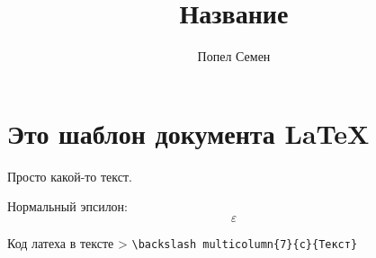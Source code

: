 \documentclass[a4paper,12pt]{article}%
\title{Название}
\author{Попел Семен}
\renewcommand{\epsilon}{\ensuremath{\varepsilon}}
\begin{document}
	
\thispagestyle{fancy}

\maketitle

\begin{abstract}

\end{abstract}

\section{Это шаблон документа \LaTeX}

Просто какой-то текст.

Нормальный эпсилон:
\[ \epsilon \]

Код латеха в тексте
> \verb!\backslash multicolumn{7}{c}{Текст}!

\lipsum[1-15]
\end{document}
